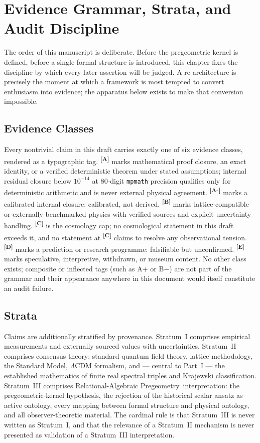 \documentclass[12pt,a4paper,twoside]{article}
\theoremstyle{plain}
\theoremstyle{definition}
\theoremstyle{remark}
\newcommand{\ProjectShort}{Relational-Algebraic Pregeometry}
\newcommand{\RAP}{\ProjectShort}
\newcommand{\catmark}[1]{\textsuperscript{\textsf{\textbf{[#1]}}}}
\begin{document}
\section{Evidence Grammar, Strata, and Audit Discipline}
\label{sec:evidence-apparatus}

\noindent The order of this manuscript is deliberate. Before the
pregeometric kernel is defined, before a single formal structure is
introduced, this chapter fixes the discipline by which every later
assertion will be judged. A re-architecture is precisely the moment at
which a framework is most tempted to convert enthusiasm into evidence; the
apparatus below exists to make that conversion impossible.

\subsection{Evidence Classes}
\label{subsec:evidence-classes}

Every nontrivial claim in this draft carries exactly one of six evidence
classes, rendered as a typographic tag. \catmark{A} marks mathematical
proof closure, an exact identity, or a verified deterministic theorem
under stated assumptions; internal residual closure below $10^{-14}$ at
80-digit \texttt{mpmath} precision qualifies only for deterministic
arithmetic and is never external physical agreement. \catmark{A-} marks a
calibrated internal closure: calibrated, not derived. \catmark{B} marks
lattice-compatible or externally benchmarked physics with verified sources
and explicit uncertainty handling. \catmark{C} is the cosmology cap; no
cosmological statement in this draft exceeds it, and no statement at
\catmark{C} claims to resolve any observational tension. \catmark{D} marks
a prediction or research programme: falsifiable but unconfirmed.
\catmark{E} marks speculative, interpretive, withdrawn, or museum content.
No other class exists; composite or inflected tags (such as A+ or B$-$)
are not part of the grammar and their appearance anywhere in this document
would itself constitute an audit failure.

\subsection{Strata}
\label{subsec:strata}

Claims are additionally stratified by provenance. Stratum~I comprises
empirical measurements and externally sourced values with uncertainties.
Stratum~II comprises consensus theory: standard quantum field theory,
lattice methodology, the Standard Model, $\Lambda$CDM formalism, and ---
central to Part~I --- the established mathematics of finite real spectral
triples and Krajewski classification. Stratum~III comprises \RAP\
interpretation: the pregeometric-kernel hypothesis, the rejection of the historical scalar ansatz as active ontology,
every mapping between formal structure and physical ontology, and all
observer-theoretic material. The cardinal rule is that Stratum~III is
never written as Stratum~I, and that the relevance of a Stratum~II
mechanism is never presented as validation of a Stratum~III
interpretation.
\end{document}
